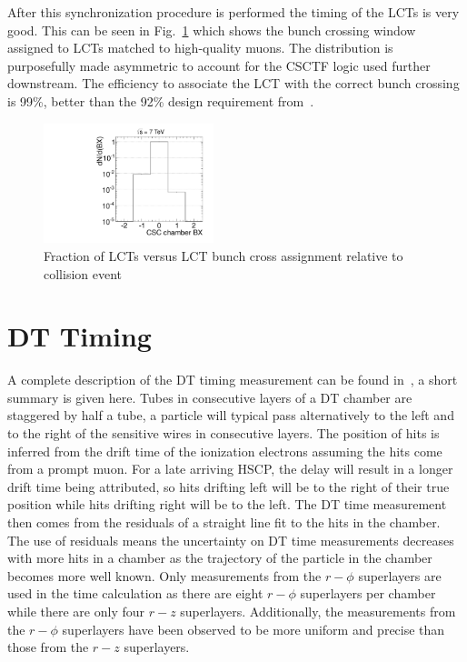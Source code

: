After this synchronization procedure is performed the timing of the LCTs is very good. This can be seen in Fig.~\ref{fig:ALCTBX} which shows the bunch crossing window
assigned to LCTs matched to high-quality muons. The distribution is purposefully made asymmetric to account for the CSCTF logic used further downstream.
The efficiency to associate the LCT with the correct bunch crossing is 99\%, better than the 92\% design requirement from~\cite{Chatrchyan:2008zzk}.

\begin{figure}
  \begin{center}
      \includegraphics[clip=true, width=0.44\textwidth]{figures/timing/ALCT_Bx}
      \caption[Fraction of LCTs versus LCT bunch crossing window assignment relative to collision event]
      {Fraction of LCTs versus LCT bunch cross assignment relative to collision event
        }
      \label{fig:ALCTBX}
  \end{center}
\end{figure}

\section{DT Timing}

A complete description of the DT timing measurement can be found in~\cite{2007AN049}, a short summary is given here.
Tubes in consecutive layers of a DT chamber are staggered by half a tube, a particle will typical pass alternatively to the left and to the right of the
sensitive wires in consecutive layers.
The position of hits is inferred from the drift time of the ionization electrons assuming the hits come from a prompt muon.
For a late arriving HSCP, the delay will result in a longer drift time being attributed, so hits drifting
left will be to the right of their true position while hits drifting right will be to the left.
The DT time measurement then comes from the residuals of a straight line fit to the hits in the chamber.
The use of residuals means the uncertainty on DT time measurements decreases with more hits in a chamber as the trajectory of the particle in the
chamber becomes more well known. Only measurements from the $r-\phi$ superlayers are used in the time calculation as there are eight $r-\phi$ superlayers
per chamber while there are only four $r-z$ superlayers. Additionally, the measurements from the $r-\phi$ superlayers have been observed to be more uniform and precise than
those from the $r-z$ superlayers.

